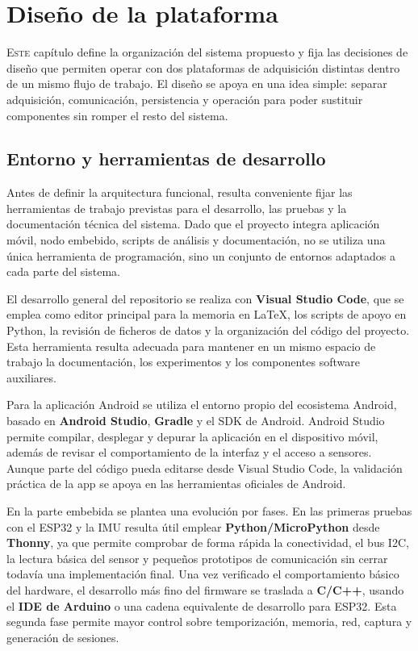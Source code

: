 \chapter{Diseño de la plataforma}
\label{chap:diseno-plataforma}

\lettrine{E}{ste} capítulo define la organización del sistema propuesto y fija las decisiones de diseño que permiten operar con dos plataformas de adquisición distintas dentro de un mismo flujo de trabajo. El diseño se apoya en una idea simple: separar adquisición, comunicación, persistencia y operación para poder sustituir componentes sin romper el resto del sistema.

\section{Entorno y herramientas de desarrollo}

Antes de definir la arquitectura funcional, resulta conveniente fijar las herramientas de trabajo previstas para el desarrollo, las pruebas y la documentación técnica del sistema. Dado que el proyecto integra aplicación móvil, nodo embebido, scripts de análisis y documentación, no se utiliza una única herramienta de programación, sino un conjunto de entornos adaptados a cada parte del sistema.

El desarrollo general del repositorio se realiza con \textbf{Visual Studio Code}, que se emplea como editor principal para la memoria en LaTeX, los scripts de apoyo en Python, la revisión de ficheros de datos y la organización del código del proyecto. Esta herramienta resulta adecuada para mantener en un mismo espacio de trabajo la documentación, los experimentos y los componentes software auxiliares.

Para la aplicación Android se utiliza el entorno propio del ecosistema Android, basado en \textbf{Android Studio}, \textbf{Gradle} y el SDK de Android. Android Studio permite compilar, desplegar y depurar la aplicación en el dispositivo móvil, además de revisar el comportamiento de la interfaz y el acceso a sensores. Aunque parte del código pueda editarse desde Visual Studio Code, la validación práctica de la app se apoya en las herramientas oficiales de Android.

En la parte embebida se plantea una evolución por fases. En las primeras pruebas con el ESP32 y la IMU resulta útil emplear \textbf{Python/MicroPython} desde \textbf{Thonny}, ya que permite comprobar de forma rápida la conectividad, el bus I2C, la lectura básica del sensor y pequeños prototipos de comunicación sin cerrar todavía una implementación final. Una vez verificado el comportamiento básico del hardware, el desarrollo más fino del firmware se traslada a \textbf{C/C++}, usando el \textbf{IDE de Arduino} o una cadena equivalente de desarrollo para ESP32. Esta segunda fase permite mayor control sobre temporización, memoria, red, captura y generación de sesiones.

